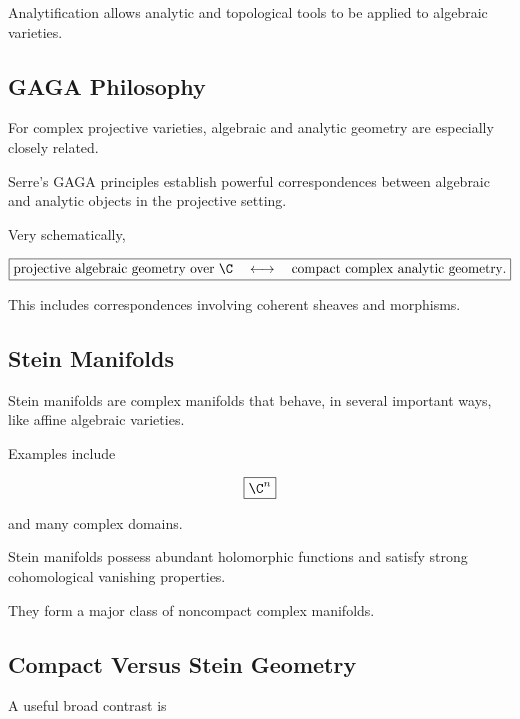 Analytification allows analytic and topological tools to be applied to
algebraic varieties.

\subsection{GAGA Philosophy}
\label{subsec:gaga-philosophy}

For complex projective varieties, algebraic and analytic geometry are
especially closely related.

Serre's GAGA principles establish powerful correspondences between
algebraic and analytic objects in the projective setting.

Very schematically,

\[
\boxed{
\text{projective algebraic geometry over }\C
\quad\longleftrightarrow\quad
\text{compact complex analytic geometry}.
}
\]

This includes correspondences involving coherent sheaves and morphisms.

\subsection{Stein Manifolds}
\label{subsec:stein-manifolds}

Stein manifolds are complex manifolds that behave, in several important
ways, like affine algebraic varieties.

Examples include

\[
\boxed{\C^n}
\]

and many complex domains.

Stein manifolds possess abundant holomorphic functions and satisfy strong
cohomological vanishing properties.

They form a major class of noncompact complex manifolds.

\subsection{Compact Versus Stein Geometry}
\label{subsec:compact-versus-stein}

A useful broad contrast is

